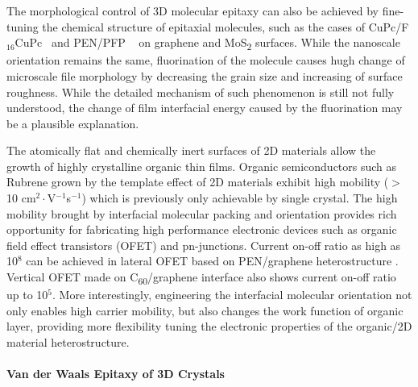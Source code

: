 The morphological control of 3D molecular epitaxy can also be achieved
by fine-tuning the chemical structure of epitaxial molecules, such as
the cases of
CuPc/F\(_{\text{16}}\)CuPc~\cite{Singha_Roy_2012_CuPc_gr_glass,Xiao_2013_jacs_CuPc_gr,Zhong_2012_gr_F16_pn_junc,Yang_2011_F16CUPc_nanowire}
and
PEN/PFP ~\cite{Salzmann_2012_fpen_gr,Breuer_2011_pent_grap}
on graphene and MoS\textsubscript{2} surfaces.
%
While the nanoscale orientation remains the same, fluorination of the
molecule causes hugh change of micro\-scale file morphology by
decreasing the grain size and increasing of surface roughness.
%
While the detailed mechanism of such phenomenon is still not fully
understood, the change of film interfacial energy caused by the
fluorination may be a plausible explanation.

The atomically flat and chemically inert surfaces of 2D materials
allow the growth of highly crystalline organic thin films. Organic semiconductors such as Rubrene
grown by the template effect of
2D materials exhibit high mobility ($>$ 10
cm$^{2}\cdot$V$^{-1}$s$^{-1}$) which is previously only achievable by
single crystal. 
%
The high mobility brought by interfacial molecular packing and
orientation provides rich opportunity for fabricating high performance
electronic devices such as organic field effect transistors (OFET) and
pn-junctions.
%
Current on-off ratio as high as 10$^{8}$ can be achieved in lateral
OFET based on PEN/graphene heterostructure .
%
Vertical OFET made on C\textsubscript{60}/graphene interface also
shows current on-off ratio up to 10$^{5}$. 
%
More interestingly, engineering the interfacial molecular orientation
not only enables high carrier mobility, but also changes the work
function of organic layer, providing more flexibility tuning the
electronic properties of the organic/2D material
heterostructure. 



\paragraph{Van der Waals Epitaxy of 3D Crystals}
\label{sec:orgeb0161b}

